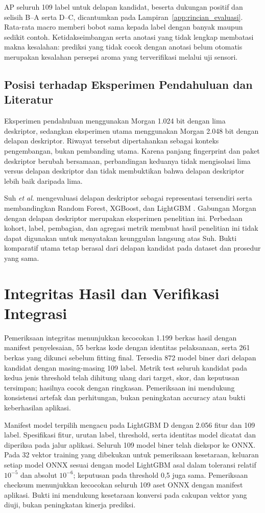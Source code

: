 AP seluruh 109 label untuk delapan kandidat, beserta dukungan positif dan selisih B--A serta D--C, dicantumkan pada Lampiran~\ref{app:rincian_evaluasi}. Rata-rata macro memberi bobot sama kepada label dengan banyak maupun sedikit contoh. Ketidakseimbangan serta anotasi yang tidak lengkap membatasi makna kesalahan: prediksi yang tidak cocok dengan anotasi belum otomatis merupakan kesalahan persepsi aroma yang terverifikasi melalui uji sensori.

\subsection{Posisi terhadap Eksperimen Pendahuluan dan Literatur}
Eksperimen pendahuluan menggunakan Morgan 1.024 bit dengan lima deskriptor, sedangkan eksperimen utama menggunakan Morgan 2.048 bit dengan delapan deskriptor. Riwayat tersebut dipertahankan sebagai konteks pengembangan, bukan pembanding utama. Karena panjang fingerprint dan paket deskriptor berubah bersamaan, perbandingan keduanya tidak mengisolasi lima versus delapan deskriptor dan tidak membuktikan bahwa delapan deskriptor lebih baik daripada lima.

Suh \textit{et al.} mengevaluasi delapan deskriptor sebagai representasi tersendiri serta membandingkan Random Forest, XGBoost, dan LightGBM \cite{suh2025}. Gabungan Morgan dengan delapan deskriptor merupakan eksperimen penelitian ini. Perbedaan kohort, label, pembagian, dan agregasi metrik membuat hasil penelitian ini tidak dapat digunakan untuk menyatakan keunggulan langsung atas Suh. Bukti komparatif utama tetap berasal dari delapan kandidat pada dataset dan prosedur yang sama.

\section{Integritas Hasil dan Verifikasi Integrasi}
Pemeriksaan integritas menunjukkan kecocokan 1.199 berkas hasil dengan manifest penyelesaian, 55 berkas kode dengan identitas pelaksanaan, serta 261 berkas yang dikunci sebelum fitting final. Tersedia 872 model biner dari delapan kandidat dengan masing-masing 109 label. Metrik test seluruh kandidat pada kedua jenis threshold telah dihitung ulang dari target, skor, dan keputusan tersimpan; hasilnya cocok dengan ringkasan. Pemeriksaan ini mendukung konsistensi artefak dan perhitungan, bukan peningkatan accuracy atau bukti keberhasilan aplikasi.

Manifest model terpilih mengacu pada LightGBM D dengan 2.056 fitur dan 109 label. Spesifikasi fitur, urutan label, threshold, serta identitas model dicatat dan diperiksa pada jalur aplikasi. Seluruh 109 model biner telah diekspor ke ONNX. Pada 32 vektor training yang dibekukan untuk pemeriksaan kesetaraan, keluaran setiap model ONNX sesuai dengan model LightGBM asal dalam toleransi relatif $10^{-5}$ dan absolut $10^{-6}$; keputusan pada threshold 0,5 juga sama. Pemeriksaan checksum menunjukkan kecocokan seluruh 109 aset ONNX dengan manifest aplikasi. Bukti ini mendukung kesetaraan konversi pada cakupan vektor yang diuji, bukan peningkatan kinerja prediksi.

